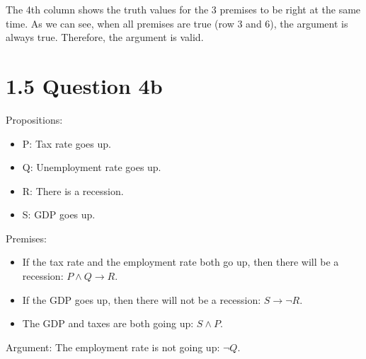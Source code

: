\documentclass[12pt]{article}
\begin{document}
	The 4th column shows the truth values for the 3 premises to be right at the same time. As we can see, when all premises are true (row 3 and 6), the argument is always true. Therefore, the argument is valid.
	
	\section{1.5 Question 4b}
	
	Propositions:
	\begin{itemize}
		\item P: Tax rate goes up.
		\item Q: Unemployment rate goes up.
		\item R: There is a recession.
		\item S: GDP goes up.
	\end{itemize}

	Premises:
	\begin{itemize}
		\item If the tax rate and the employment rate both go up, then there will be a recession: $P \land Q \rightarrow R$.
		\item If the GDP goes up, then there will not be a recession: $S \rightarrow \lnot R$.
		\item The GDP and taxes are both going up: $S \land P$.
	\end{itemize}
	
	Argument: The employment rate is not going up: $\lnot Q$.
	
\end{document}
